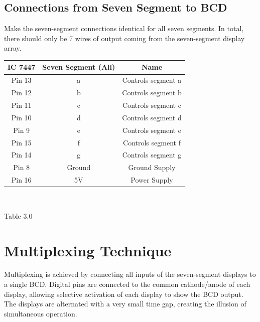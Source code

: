 \documentclass[conference]{IEEEtran}
\begin{document}
\subsection{Connections from Seven Segment to BCD}
\raggedright
Make the seven-segment connections identical for all seven segments. In total, there should only be 7 wires of output coming from the seven-segment display array.
\vspace{0.25cm}
\centering
\begin{tabular}{|c|c|c|}
\hline
IC 7447 & Seven Segment (All) & Name\\
\hline
Pin 13 & a & Controls segment a\\
\hline
Pin 12 & b & Controls segment b\\
\hline
Pin 11 & c & Controls segment c\\
\hline
Pin 10 & d & Controls segment d\\
\hline
Pin 9 & e & Controls segment e\\
\hline
Pin 15 & f & Controls segment f\\
\hline
Pin 14 & g & Controls segment g\\
\hline
Pin 8 & Ground & Ground Supply\\
\hline
Pin 16 & 5V & Power Supply\\
\hline
\end{tabular}\\
\centerline{Table 3.0}

\section{Multiplexing Technique}
Multiplexing is achieved by connecting all inputs of the seven-segment displays to a single BCD. Digital pins are connected to the common cathode/anode of each display, allowing selective activation of each display to show the BCD output. The displays are alternated with a very small time gap, creating the illusion of simultaneous operation.
\end{document}

